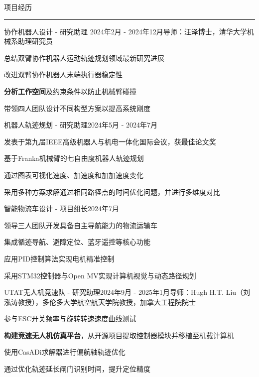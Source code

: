 \documentclass{resume} %
\renewenvironment{rSection}[1]{
\sectionskip
\textcolor{TsinghuaPurple}{\MakeUppercase{#1}}
\sectionlineskip
\hrule
\begin{list}{}{
\setlength{\leftmargin}{0em}
}
\item[]
}{
\end{list}
}
\begin{document}
\begin{rSection}{项目经历}

\begin{rSubsection}{协作机器人设计 - 研究助理} {2024年2月 - 2024年12月}{导师：汪泽博士，清华大学机械系助理研究员}{}

\item 总结双臂协作机器人运动轨迹规划领域最新研究进展
\item 改进双臂协作机器人末端执行器稳定性
\item \textbf{分析工作空间}及约束条件以防止机械臂碰撞
\item 带领四人团队设计不同构型方案以提高系统刚度

\end{rSubsection}  


\begin{rSubsection}{机器人轨迹规划 - 研究助理}{2024年5月 - 2024年7月}{}{} 
\item 发表于第九届IEEE高级机器人与机电一体化国际会议，获最佳论文奖
\item 基于Franka机械臂的七自由度机器人轨迹规划
\item 通过图表可视化速度、加速度和加加速度变化
\item 采用多种方案求解通过相同路径点的时间优化问题，并进行多维度对比

\end{rSubsection}



\begin{rSubsection}{智能物流车设计 - 项目组长}{2024年7月}{}{}

\item 领导三人团队开发具备自主导航能力的物流运输车
\item 集成循迹导航、避障定位、蓝牙遥控等核心功能
\item 应用PID控制算法实现电机精准控制
\item 采用STM32控制器与Open MV实现计算机视觉与动态路径规划

\end{rSubsection}

\newpage
\begin{rSubsection}{UTAT无人机竞速队 - 研究助理}{2024年9月 - 2025年1月}{导师：Hugh H.T. Liu（刘泓涛教授），多伦多大学航空航天学院教授，加拿大工程院院士}{}    

\item 参与ESC开关频率与旋转转速速度曲线测试
\item \textbf{构建竞速无人机仿真平台}，从开源项目提取控制器模块并移植至机载计算机
\item 使用CasADi求解器进行偏航轴轨迹优化
\item 通过优化轨迹延长闸门识别时间，提升定位精度


\end{rSubsection}
\end{rSection}
\end{document}
